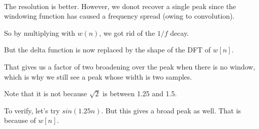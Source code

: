 \documentclass[11pt]{article}
\begin{document}
    \begin{center}
    \end{center}
    { \hspace*{\fill} \\}
    
    The resolution is better. However, we donot recover a single peak since
the windowing function has caused a frequency spread (owing to
convolution).

So by multiplying with \(w(n)\), we got rid of the \(1/ f\) decay.

But the delta function is now replaced by the shape of the DFT of
\(w[n]\).

That gives us a factor of two broadening over the peak when there is no
window, which is why we still see a peak whose width is two samples.

Note that it is not because \(\sqrt{2}\) is between 1.25 and 1.5.

To verify, let's try \(sin(1.25n)\). But this gives a broad peak as
well. That is because of \(w[n]\).
\end{document}
